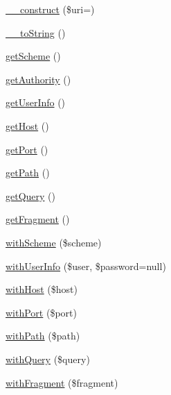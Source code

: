 \begin{DoxyCompactItemize}
\item 
\hyperlink{classGuzzleHttp_1_1Psr7_1_1Uri_a4b906efba58c4af89b5aa48a13d41103}{\+\_\+\+\_\+construct} (\$uri=\textquotesingle{}\textquotesingle{})
\item 
\hyperlink{classGuzzleHttp_1_1Psr7_1_1Uri_a98b6fcc3c3be3fb070fcb95fec762e7f}{\+\_\+\+\_\+to\+String} ()
\item 
\hyperlink{classGuzzleHttp_1_1Psr7_1_1Uri_a3357bfcc071b00cecace2fa086bea14a}{get\+Scheme} ()
\item 
\hyperlink{classGuzzleHttp_1_1Psr7_1_1Uri_a242d836c28cb339c59d64d704a30b7e1}{get\+Authority} ()
\item 
\hyperlink{classGuzzleHttp_1_1Psr7_1_1Uri_aabfb1fcf87f211fc73783d99adf09c8e}{get\+User\+Info} ()
\item 
\hyperlink{classGuzzleHttp_1_1Psr7_1_1Uri_a77cd782c426d48880a457a0a54c46d5d}{get\+Host} ()
\item 
\hyperlink{classGuzzleHttp_1_1Psr7_1_1Uri_abea314869a6934b7675dd516c72715f9}{get\+Port} ()
\item 
\hyperlink{classGuzzleHttp_1_1Psr7_1_1Uri_a063016fa7af70993d74f3c4efa4e9246}{get\+Path} ()
\item 
\hyperlink{classGuzzleHttp_1_1Psr7_1_1Uri_a67650b5b4d619cb30e2951da11d0f369}{get\+Query} ()
\item 
\hyperlink{classGuzzleHttp_1_1Psr7_1_1Uri_aeda26bc60e5aef6d506ce43be28409ca}{get\+Fragment} ()
\item 
\hyperlink{classGuzzleHttp_1_1Psr7_1_1Uri_aca8720e1011bf77b98a02b47fb4b3c12}{with\+Scheme} (\$scheme)
\item 
\hyperlink{classGuzzleHttp_1_1Psr7_1_1Uri_aeb03c98c387f104b68a93dac0ab047e8}{with\+User\+Info} (\$user, \$password=null)
\item 
\hyperlink{classGuzzleHttp_1_1Psr7_1_1Uri_a6676d1155c9a628ff53a1d18795a4b6c}{with\+Host} (\$host)
\item 
\hyperlink{classGuzzleHttp_1_1Psr7_1_1Uri_af06111c4b19c09ce8f1902b803016950}{with\+Port} (\$port)
\item 
\hyperlink{classGuzzleHttp_1_1Psr7_1_1Uri_a80fdae1020f7a4bd60cc8f117a8966e3}{with\+Path} (\$path)
\item 
\hyperlink{classGuzzleHttp_1_1Psr7_1_1Uri_a7b73f53c542c9508b14d5f002699560e}{with\+Query} (\$query)
\item 
\hyperlink{classGuzzleHttp_1_1Psr7_1_1Uri_a4989797bf5e76f44e5c2c1332ea5a7ec}{with\+Fragment} (\$fragment)
\end{DoxyCompactItemize}
